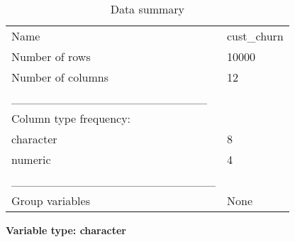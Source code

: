 \documentclass[
]{article}
\begin{document}
\begin{longtable}[]{@{}ll@{}}
\caption{Data summary}\tabularnewline
\toprule\noalign{}
\endfirsthead
\endhead
\bottomrule\noalign{}
\endlastfoot
Name & cust\_churn \\
Number of rows & 10000 \\
Number of columns & 12 \\
\_\_\_\_\_\_\_\_\_\_\_\_\_\_\_\_\_\_\_\_\_\_\_ & \\
Column type frequency: & \\
character & 8 \\
numeric & 4 \\
\_\_\_\_\_\_\_\_\_\_\_\_\_\_\_\_\_\_\_\_\_\_\_\_ & \\
Group variables & None \\
\end{longtable}

\textbf{Variable type: character}
\end{document}
